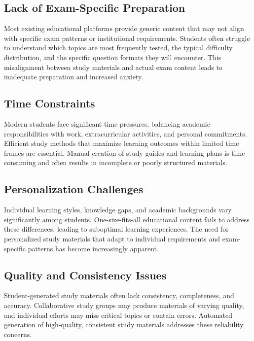 \documentclass[conference]{IEEEtran}
\begin{document}
\subsection{Lack of Exam-Specific Preparation}

Most existing educational platforms provide generic content that may not align with specific exam patterns or institutional requirements. Students often struggle to understand which topics are most frequently tested, the typical difficulty distribution, and the specific question formats they will encounter. This misalignment between study materials and actual exam content leads to inadequate preparation and increased anxiety.

\subsection{Time Constraints}

Modern students face significant time pressures, balancing academic responsibilities with work, extracurricular activities, and personal commitments. Efficient study methods that maximize learning outcomes within limited time frames are essential. Manual creation of study guides and learning plans is time-consuming and often results in incomplete or poorly structured materials.

\subsection{Personalization Challenges}

Individual learning styles, knowledge gaps, and academic backgrounds vary significantly among students. One-size-fits-all educational content fails to address these differences, leading to suboptimal learning experiences. The need for personalized study materials that adapt to individual requirements and exam-specific patterns has become increasingly apparent.

\subsection{Quality and Consistency Issues}

Student-generated study materials often lack consistency, completeness, and accuracy. Collaborative study groups may produce materials of varying quality, and individual efforts may miss critical topics or contain errors. Automated generation of high-quality, consistent study materials addresses these reliability concerns.
\end{document}
